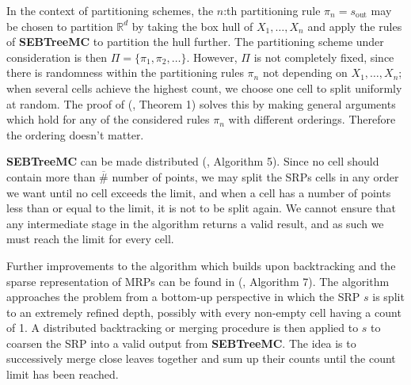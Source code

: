 \documentclass{report}
\begin{document}
In the context of partitioning schemes, the $n$:th partitioning rule $\pi_n = s_\text{out}$ may be chosen to partition $\mathbb{R}^d$ by taking the box hull of $X_1,\dots,X_n$  
and apply the rules of \textbf{SEBTreeMC} to partition the hull further. The partitioning scheme under consideration is then $\Pi = \{\pi_1,\pi_2,\dots\}$. However, $\Pi$ is not completely fixed, since
there is randomness within the partitioning rules $\pi_n$ not depending on $X_1,\dots,X_n$; when several cells achieve the highest count, we choose one cell to split uniformly at random. 
The proof of (\cite{MDE}, Theorem 1) solves this by making general arguments which hold for any of the considered rules $\pi_n$ with different orderings.
Therefore the ordering doesn't matter.

\textbf{SEBTreeMC} can be made distributed (\cite{Scalable Multivariate Histograms}, Algorithm 5). Since no cell should contain more than $\overline{\#}$ number of points, 
we may split the SRPs cells in any order we want until no cell exceeds the limit, and when a cell has a number of points less than or equal to the limit, it is not
to be split again. We cannot ensure that any intermediate stage in the algorithm returns a valid result, and as such we must reach the limit for every cell.

Further improvements to the algorithm which builds upon backtracking and the sparse representation of MRPs can be found in (\cite{Scalable Algorithms}, Algorithm 7). 
The algorithm approaches the problem from a bottom-up perspective in which the SRP $s$ is split to an extremely refined depth, possibly with every non-empty cell having a count of 1. 
A distributed backtracking or merging procedure is then applied to $s$ to coarsen the SRP into a valid output from \textbf{SEBTreeMC}. The idea is to successively merge close leaves together
and sum up their counts until the count limit has been reached. 
\end{document}
